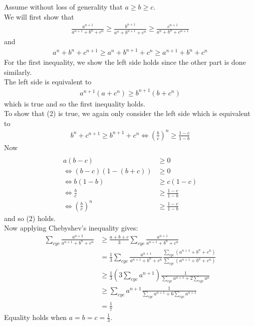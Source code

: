 \documentclass{article}
\begin{document}
\begin{enumerate}
Assume without loss of generality that $a \geq b \geq c$.
\\ We will first show that 
\begin{align} 
\frac{a^{n+1}}{a^{n+1}+b^{n}+c^{n}} \geq \frac{b^{n+1}}{a^{n}+b^{n+1}+c^{n}} \geq \frac{c^{n+1}}{a^{n}+b^{n}+c^{n+1}}
\end{align}
and 
\begin{align}
a^{n}+b^{n}+c^{n+1} \geq a^{n}+b^{n+1}+c^{n} \geq a^{n+1}+b^{n}+c^{n}
\end{align}
For the first inequality, we show the left side holds since the other part is done similarly.
\\ The left side is equivalent to
\begin{align*}
 a^{n+1}(a+c^{n}) \geq b^{n+1}(b+c^{n})
\end{align*}
which is true and so the first inequality holds. 
\\ To show that (2) is true, we again only consider the left side which is equivalent to 
\begin{align*}
b^{n}+c^{n+1} \geq b^{n+1}+c^{n}
\iff (\frac{b}{c})^{n} \geq \frac{1-c}{1-b}
\end{align*}
Now
\begin{align*}
\\a(b-c)&\geq 0 
\\ \iff (b-c)(1-(b+c))&\geq 0
\\ \iff b(1-b)&\geq c(1-c) 
\\ \iff \frac{b}{c} &\geq \frac{1-c}{1-b}
\\ \iff (\frac{b}{c})^{n} &\geq \frac{1-c}{1-b}
\end{align*}
and so (2) holds.
\\Now applying Chebyshev's inequality gives:
\begin{align*} 
\sum_{cyc}\frac{a^{n+2}}{a^{n+1}+b^{n}+c^{n}} &\geq \frac{a+b+c}{3}\sum_{cyc}\frac{a^{n+1}}{a^{n+1}+b^{n}+c^{n}} \\ &=\frac{1}{3}\sum_{cyc}\frac{a^{n+1}}{a^{n+1}+b^{n}+c^{n}}\frac{\sum_{cyc}(a^{n+1}+b^{n}+c^{n})}{\sum_{cyc}(a^{n+1}+b^{n}+c^{n})}\\
&\geq \frac{1}{3}(3\sum_{cyc}a^{n+1})\frac{1}{\sum_{cyc}a^{n+1}+2\sum_{cyc}a^{n}}\\
&\geq \sum_{cyc}a^{n+1}\frac{1}{\sum_{cyc}a^{n+1}+6\sum_{cyc}a^{n+1}}
\\&=\frac{1}{7}
\end{align*}
Equality holds when $a=b=c=\frac{1}{3}$.

\end{enumerate}
\end{document}
